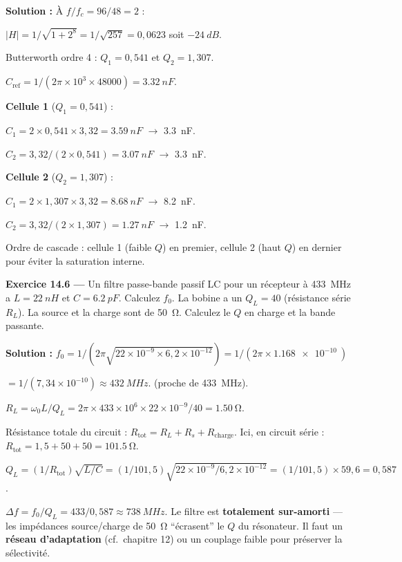 \documentclass[12pt,a4paper,twoside]{book}
\begin{document}
\begin{pratique}
\textbf{Solution :} À $f/f_c = 96/48 = 2$ :

$|H| = 1/\sqrt{1+2^8} = 1/\sqrt{257} = 0{,}0623$ soit $\SI{-24}{dB}$.

Butterworth ordre 4 : $Q_1 = 0{,}541$ et $Q_2 = 1{,}307$.

$C_{\text{ref}} = 1/(2\pi\times10^3\times48000) = \SI{3.32}{nF}$.

\textbf{Cellule 1} ($Q_1 = 0{,}541$) :

$C_1 = 2\times0{,}541\times3{,}32 = \SI{3.59}{nF}$ $\to$ \SI{3.3}{nF}.

$C_2 = 3{,}32/(2\times0{,}541) = \SI{3.07}{nF}$ $\to$ \SI{3.3}{nF}.

\textbf{Cellule 2} ($Q_2 = 1{,}307$) :

$C_1 = 2\times1{,}307\times3{,}32 = \SI{8.68}{nF}$ $\to$ \SI{8.2}{nF}.

$C_2 = 3{,}32/(2\times1{,}307) = \SI{1.27}{nF}$ $\to$ \SI{1.2}{nF}.

Ordre de cascade : cellule 1 (faible $Q$) en premier, cellule 2 (haut $Q$) en dernier pour éviter la saturation interne.
\end{pratique}

\textbf{Exercice 14.6 ---} Un filtre passe-bande passif LC pour un récepteur à \SI{433}{MHz} a $L = \SI{22}{nH}$ et $C = \SI{6.2}{pF}$. Calculez $f_0$. La bobine a un $Q_L = 40$ (résistance série $R_L$). La source et la charge sont de \SI{50}{\ohm}. Calculez le $Q$ en charge et la bande passante.

\begin{pratique}
\textbf{Solution :} $f_0 = 1/(2\pi\sqrt{22\times10^{-9}\times6{,}2\times10^{-12}}) = 1/(2\pi\times\SI{1.168e-10}{})$

$= 1/(7{,}34\times10^{-10}) \approx \SI{432}{MHz}$. \checkmark{} (proche de \SI{433}{MHz}).

$R_L = \omega_0 L/Q_L = 2\pi\times433\times10^6\times22\times10^{-9}/40 = \SI{1.50}{\ohm}$.

Résistance totale du circuit : $R_{\text{tot}} = R_L + R_s + R_{\text{charge}}$. Ici, en circuit série : $R_{\text{tot}} = 1{,}5 + 50 + 50 = \SI{101.5}{\ohm}$.

$Q_L = (1/R_{\text{tot}})\sqrt{L/C} = (1/101{,}5)\sqrt{22\times10^{-9}/6{,}2\times10^{-12}} = (1/101{,}5)\times59{,}6 = 0{,}587$.

$\Delta f = f_0/Q_L = 433/0{,}587 \approx \SI{738}{MHz}$. Le filtre est \textbf{totalement sur-amorti} --- les impédances source/charge de \SI{50}{\ohm} ``écrasent'' le $Q$ du résonateur. Il faut un \textbf{réseau d'adaptation} (cf.\ chapitre 12) ou un couplage faible pour préserver la sélectivité.
\end{pratique}
\end{document}
